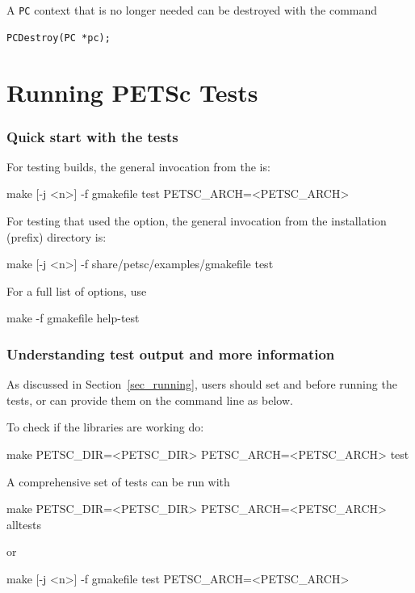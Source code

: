{{{A \lstinline{PC} context that is no longer needed can be destroyed with the
command
\begin{lstlisting}
PCDestroy(PC *pc);
\end{lstlisting}

\chapter{Running PETSc Tests}
\label{sec_runningtests}

\subsection{Quick start with the tests}

For testing builds, the general invocation from the  is:
\begin{bashlisting}
make [-j <n>] -f gmakefile test PETSC_ARCH=<PETSC_ARCH>
\end{bashlisting}

For testing  that used the  option, the general invocation from the installation (prefix)
directory is:
\begin{bashlisting}
make [-j <n>] -f share/petsc/examples/gmakefile test
\end{bashlisting}

For a full list of options, use
\begin{bashlisting}
make -f gmakefile help-test
\end{bashlisting}

\subsection{Understanding test output and more information}

As discussed in Section~\ref{sec_running},
users should set  and  before running
the tests, or can provide them on the command line as below.

To check if the libraries are working do:
\begin{bashlisting}
make PETSC_DIR=<PETSC_DIR> PETSC_ARCH=<PETSC_ARCH> test
\end{bashlisting}

A comprehensive  set of tests can be run with
\begin{bashlisting}
make PETSC_DIR=<PETSC_DIR> PETSC_ARCH=<PETSC_ARCH> alltests
\end{bashlisting}
or
\begin{bashlisting}
make [-j <n>] -f gmakefile test PETSC_ARCH=<PETSC_ARCH>
\end{bashlisting}

}}}

